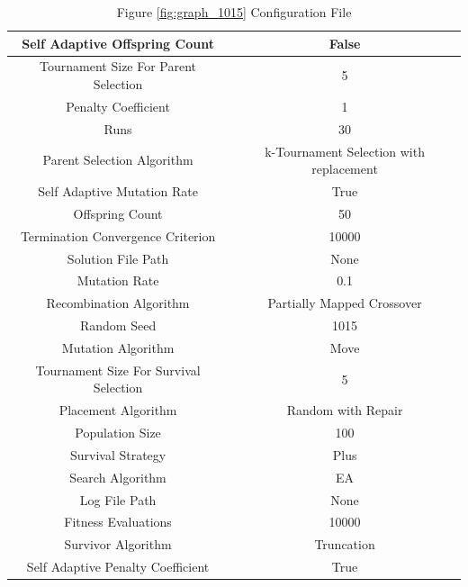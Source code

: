 \documentclass{standalone}
\begin{document}
\begin{table}[!htb]
	\centering
	\caption{Figure \ref{fig:graph_1015} Configuration File}
	\label{tab:graph_1015}
	\begin{tabular}{| c | c |}
		\hline
		Self Adaptive Offspring Count		& False		 \\
		\hline
		Tournament Size For Parent Selection		& 5		 \\
		\hline
		Penalty Coefficient		& 1		 \\
		\hline
		Runs		& 30		 \\
		\hline
		Parent Selection Algorithm		& k-Tournament Selection with replacement		 \\
		\hline
		Self Adaptive Mutation Rate		& True		 \\
		\hline
		Offspring Count		& 50		 \\
		\hline
		Termination Convergence Criterion		& 10000		 \\
		\hline
		Solution File Path		& None		 \\
		\hline
		Mutation Rate		& 0.1		 \\
		\hline
		Recombination Algorithm		& Partially Mapped Crossover		 \\
		\hline
		Random Seed		& 1015		 \\
		\hline
		Mutation Algorithm		& Move		 \\
		\hline
		Tournament Size For Survival Selection		& 5		 \\
		\hline
		Placement Algorithm		& Random with Repair		 \\
		\hline
		Population Size		& 100		 \\
		\hline
		Survival Strategy		& Plus		 \\
		\hline
		Search Algorithm		& EA		 \\
		\hline
		Log File Path		& None		 \\
		\hline
		Fitness Evaluations		& 10000		 \\
		\hline
		Survivor Algorithm		& Truncation		 \\
		\hline
		Self Adaptive Penalty Coefficient		& True		 \\
		\hline
	\end{tabular}
\end{table}
\end{document}

